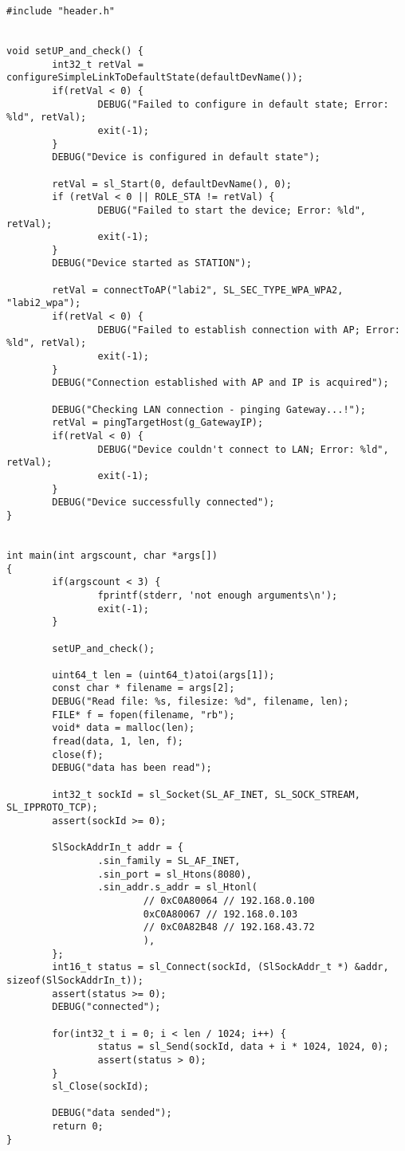 \begin{verbatim}
#include "header.h"


void setUP_and_check() {
        int32_t retVal = configureSimpleLinkToDefaultState(defaultDevName());
        if(retVal < 0) {
                DEBUG("Failed to configure in default state; Error: %ld", retVal);
                exit(-1);
        }
        DEBUG("Device is configured in default state");

        retVal = sl_Start(0, defaultDevName(), 0);
        if (retVal < 0 || ROLE_STA != retVal) {
                DEBUG("Failed to start the device; Error: %ld", retVal);
                exit(-1);
        }
        DEBUG("Device started as STATION");

        retVal = connectToAP("labi2", SL_SEC_TYPE_WPA_WPA2, "labi2_wpa");
        if(retVal < 0) {
                DEBUG("Failed to establish connection with AP; Error: %ld", retVal);
                exit(-1);
        }
        DEBUG("Connection established with AP and IP is acquired");

        DEBUG("Checking LAN connection - pinging Gateway...!");
        retVal = pingTargetHost(g_GatewayIP);
        if(retVal < 0) {
                DEBUG("Device couldn't connect to LAN; Error: %ld", retVal);
                exit(-1);
        }
        DEBUG("Device successfully connected");
}


int main(int argscount, char *args[])
{
        if(argscount < 3) {
                fprintf(stderr, 'not enough arguments\n');
                exit(-1);
        }

        setUP_and_check();

        uint64_t len = (uint64_t)atoi(args[1]);
        const char * filename = args[2];
        DEBUG("Read file: %s, filesize: %d", filename, len);
        FILE* f = fopen(filename, "rb");
        void* data = malloc(len);
        fread(data, 1, len, f);
        close(f);
        DEBUG("data has been read");

        int32_t sockId = sl_Socket(SL_AF_INET, SL_SOCK_STREAM, SL_IPPROTO_TCP);
        assert(sockId >= 0);

        SlSockAddrIn_t addr = {
                .sin_family = SL_AF_INET,
                .sin_port = sl_Htons(8080),
                .sin_addr.s_addr = sl_Htonl(
                        // 0xC0A80064 // 192.168.0.100
                        0xC0A80067 // 192.168.0.103
                        // 0xC0A82B48 // 192.168.43.72
                        ),
        };
        int16_t status = sl_Connect(sockId, (SlSockAddr_t *) &addr, sizeof(SlSockAddrIn_t));
        assert(status >= 0);
        DEBUG("connected");

        for(int32_t i = 0; i < len / 1024; i++) {
                status = sl_Send(sockId, data + i * 1024, 1024, 0);
                assert(status > 0);
        }
        sl_Close(sockId);

        DEBUG("data sended");
        return 0;
}
\end{verbatim}

